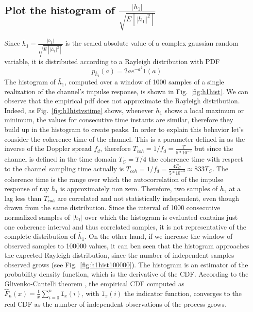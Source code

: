 \documentclass[10pt]{article}
\begin{document}
\subsection*{Plot the histogram of $\frac{|h_1|}{\sqrt{E[|h_1|^2]}}$}
Since $\bar{h}_1 = \frac{|h_1|}{\sqrt{E[|h_1|^2]}}$ is the scaled absolute value of a complex gaussian random variable, it is distributed according to a Rayleigh distribution with PDF
\begin{equation}
  p_{\bar{h}_i}(a) = 2a e^{-a^2} 1(a)
\end{equation}
The histogram of $\bar{h}_1$, computed over a window of 1000 samples of a single realization of the channel's impulse response, is shown in Fig.~\ref{fig:h1hist}. We can observe that the empirical pdf does not approximate the Rayleigh distribution. Indeed, as Fig.~\ref{fig:h1histvstime} shows, whenever $\bar{h}_1$ shows a local maximum or minimum, the values for consecutive time instants are similar, therefore they build up in the histogram to create peaks. In order to explain this behavior let's consider the coherence time of the channel. This is a parameter defined in \cite{bc} as the inverse of the Doppler spread $f_d$, therefore $T_{coh} = 1/f_d = \frac{T}{5*10^{-3}}$ but since the channel is defined in the time domain $T_C = T/4$ the coherence time with respect to the channel sampling time actually is $T_{coh} = 1/f_d = \frac{4T_C}{5*10^{-3}} \approx 833T_C$.
The coherence time is the range over which the autocorrelation of the impulse response of ray $h_1$ is approximately non zero. Therefore, two samples of $h_1$ at a lag less than $T_{coh}$ are correlated and not statistically independent, even though drawn from the same distribution. Since the interval of 1000 consecutive normalized samples of $|h_1|$ over which the histogram is evaluated contains just one coherence interval and thus correlated samples, it is not representative of the complete distribution of $\bar{h}_1$. On the other hand, if we increase the window of observed samples to 100000 values, it can ben seen that the histogram approaches the expected Rayleigh distribution, since the number of independent samples observed grows (see Fig.~\ref{fig:h1hist100000}). The histogram is an estimator of the probability density function, which is the derivative of the CDF. According to the Glivenko-Cantelli theorem \cite{tucker}, the empirical CDF computed as $\hat{F}_n(x) = \frac{1}{x}\sum_{i = 0}^n \texttt{I}_x(i)$, with $\texttt{I}_x(i)$ the indicator function, converges to the real CDF as the number of independent observations of the process grows.
\end{document}
